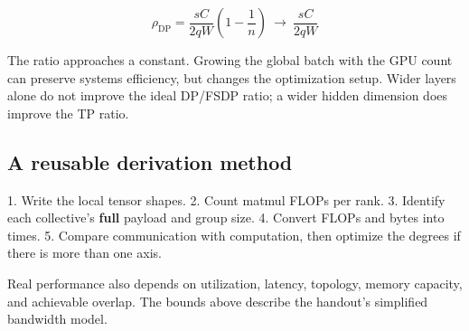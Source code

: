 \documentclass[10pt,a4paper]{article}
\begin{document}
\[\rho_{\mathrm{DP}}=\frac{sC}{2qW}\left(1-\frac{1}{n}\right)\ \longrightarrow\ \frac{sC}{2qW}\]

The ratio approaches a constant. Growing the global batch with the GPU count can preserve systems efficiency, but changes the optimization setup. Wider layers alone do not improve the ideal DP/FSDP ratio; a wider hidden dimension does improve the TP ratio.\par

\subsection*{A reusable derivation method}

1. Write the local tensor shapes.  2. Count matmul FLOPs per rank.  3. Identify each collective's \textbf{full} payload and group size.  4. Convert FLOPs and bytes into times.  5. Compare communication with computation, then optimize the degrees if there is more than one axis.\par

{\small Real performance also depends on utilization, latency, topology, memory capacity, and achievable overlap. The bounds above describe the handout's simplified bandwidth model.}\par
\end{document}

